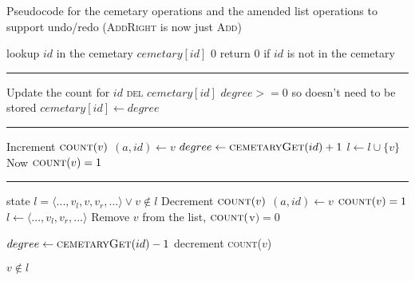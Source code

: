 \documentclass[diss.tex]{subfiles}
\begin{document}
%
\begin{algorithm}[H]
\caption{Pseudocode for the cemetary operations and the amended list operations to support undo/redo (\textsc{AddRight} is now just \textsc{Add})}
\begin{algorithmic}[1]
 \Comment lookup $id$ in the cemetary
\State \Return $cemetary[id]$
\Else
\State \Return $0$ \Comment return 0 if $id$ is not in the cemetary
\EndIf

\EndFunction
\end{algorithmic}

\hrule 

\begin{algorithmic}[1]
 \Comment Update the count for $id$
\State \textsc{del} $cemetary[id]$	\Comment $degree >= 0$ so doesn't need to be stored
\Else
\State $cemetary[id] \gets degree$
\EndIf
\EndFunction
\end{algorithmic}

\hrule 

\begin{algorithmic}[1]
\Comment Increment $\textsc{count}(v)$
\State $(a, id) \gets v$
\State $degree \gets \Call{cemetaryGet}{id} + 1$
\State $l \gets l \cup \{v\}$ \Comment Now $\textsc{count}(v)=1$
\Else
\State {}
\EndIf



\EndFunction
\end{algorithmic}

\hrule 

\begin{algorithmic}[1]
\Require state $l = \langle ..., v_l, v, v_r, ... \rangle \vee v \notin l$
 \Comment Decrement $\textsc{count}(v)$
\State $(a, id) \gets v$
 \Comment $\textsc{count}(v)=1$
\State $l \gets \langle ..., v_l, v_r, ... \rangle$ \Comment Remove $v$ from the list, $\textsc{count}($v$) = 0$

\Else
\State $degree \gets \Call{cemetaryGet}{id} - 1$
\State {} \Comment decrement \textsc{count}($v$)
\EndIf

\EndFunction
\Ensure $v \notin l$
\end{algorithmic}
\end{algorithm}
%
%
\end{document}
